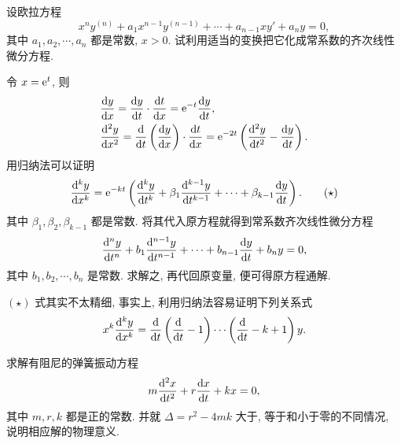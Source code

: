 \begin{exercise}
  设欧拉方程
  \[x^ny^{(n)}+a_1x^{n-1}y^{(n-1)}+\cdots+a_{n-1}xy'+a_ny=0,\]
  其中 $a_1,a_2,\cdots,a_n$ 都是常数, $x>0$. 试利用适当的变换把它化成常系数的齐次线性微分方程.
\end{exercise}

\begin{solution} 
  令 $x=\mathrm{e}^t$, 则
  \begin{align*}
  & \frac{\diff y}{\diff x}=\frac{\diff y}{\diff t}\cdot\frac{\diff t}{\diff x}=\e^{-t}\frac{\diff y}{\diff t}, \\
  & \frac{\diff^2y}{\diff x^2}=\frac{\diff}{\diff t}\left(\frac{\diff y}{\diff x}\right)\cdot\frac{\diff t}{\diff x}=\e^{-2t}\left(\frac{\diff^2y}{\diff t^2}-\frac{\diff y}{\diff t}\right).
  \end{align*}
  用归纳法可以证明
  \begin{equation}
    \frac{\diff^ky}{\diff x^k} = \e^{-kt}\left(\frac{\diff^ky}{\diff t^k}
    + \beta_1\frac{\diff^{k-1}y}{\diff t^{k-1}}
    + \cdots+\beta_{k-1}\frac{\diff y}{\diff t}\right). \tag{$\star$}
  \end{equation}
  其中 $\beta_1,\beta_2,\beta_{k-1}$ 都是常数. 将其代入原方程就得到常系数齐次线性微分方程
  \[\frac{\mathop{}\!\mathrm{d}^ny}{\mathop{}\!\mathrm{d} t^n}+b_1\frac{\mathop{}\!\mathrm{d}^{n-1}y}{\mathop{}\!\mathrm{d} t^{n-1}}+\cdots+b_{n-1}\frac{\mathop{}\!\mathrm{d} y}{\mathop{}\!\mathrm{d} t}+b_ny=0,\]
  其中 $b_1,b_2,\cdots,b_n$ 是常数. 求解之, 再代回原变量, 便可得原方程通解.
\end{solution}

\begin{remark}
  $(\star)$ 式其实不太精细, 事实上, 利用归纳法容易证明下列关系式
  \[x^k\frac{\diff^ky}{\diff x^k}
  = \frac{\diff}{\diff t}\left(\frac{\diff}{\diff t}-1\right)
  \cdots\left(\frac{\diff}{\diff t}-k+1\right)y.\]
\end{remark}


\begin{exercise}
  求解有阻尼的弹簧振动方程
  \[m\frac{\mathop{}\!\mathrm{d}^2x}{\mathop{}\!\mathrm{d} t^2}+r\frac{\mathop{}\!\mathrm{d} x}{\mathop{}\!\mathrm{d} t}+kx=0,\]
  其中 $m,r,k$ 都是正的常数. 并就 $\Delta=r^2-4mk$ 大于, 等于和小于零的不同情况, 说明相应解的物理意义.
\end{exercise}

